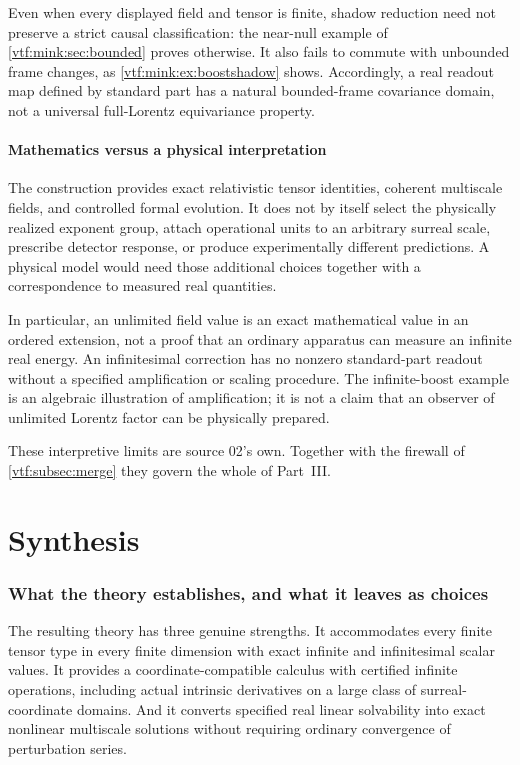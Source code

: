 \documentclass[11pt,letterpaper]{article}
\theoremstyle{definition}
\theoremstyle{remark}
\begin{document}
Even when every displayed field and tensor is finite, shadow reduction need not preserve a strict causal classification: the near-null example of \cref{vtf:mink:sec:bounded} proves otherwise. It also fails to commute with unbounded frame changes, as \cref{vtf:mink:ex:boostshadow} shows. Accordingly, a real readout map defined by standard part has a natural bounded-frame covariance domain, not a universal full-Lorentz equivariance property.

\subsection{Mathematics versus a physical interpretation}
The construction provides exact relativistic tensor identities, coherent multiscale fields, and controlled formal evolution. It does not by itself select the physically realized exponent group, attach operational units to an arbitrary surreal scale, prescribe detector response, or produce experimentally different predictions. A physical model would need those additional choices together with a correspondence to measured real quantities.

In particular, an unlimited field value is an exact mathematical value in an ordered extension, not a proof that an ordinary apparatus can measure an infinite real energy. An infinitesimal correction has no nonzero standard-part readout without a specified amplification or scaling procedure. The infinite-boost example is an algebraic illustration of amplification; it is not a claim that an observer of unlimited Lorentz factor can be physically prepared.

These interpretive limits are source 02's own. Together with the firewall of
\cref{vtf:subsec:merge} they govern the whole of Part~III.

\part{Synthesis}\label{vtf:part:synthesis}

\section{What the theory establishes, and what it leaves as choices}\label{vtf:sec:conclusion}

The resulting theory has three genuine strengths. It accommodates every
finite tensor type in every finite dimension with exact infinite and
infinitesimal scalar values. It provides a coordinate-compatible calculus
with certified infinite operations, including actual intrinsic derivatives
on a large class of surreal-coordinate domains. And it converts specified
real linear solvability into exact nonlinear multiscale solutions without
requiring ordinary convergence of perturbation series.
\end{document}
